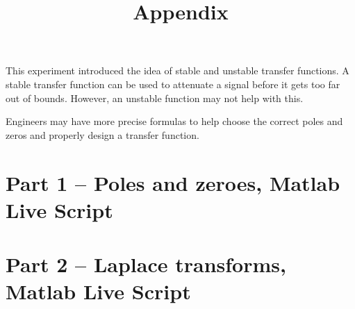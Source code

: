 \documentclass[12pt]{article}
\begin{document}
This experiment introduced the idea of stable and unstable transfer functions.
A stable transfer function can be used to attenuate a signal before it gets too far out of bounds.
However, an unstable function may not help with this.

Engineers may have more precise formulas to help choose the correct poles and zeros and properly design a transfer function.


\newpage
\appendix
\title{Appendix}\label{doc:apx}
\maketitle

\section{Part 1 -- Poles and zeroes, Matlab Live Script}



\section{Part 2 -- Laplace transforms, Matlab Live Script}


\end{document}
